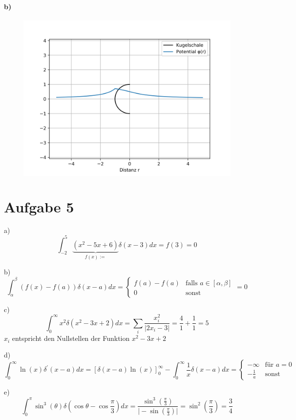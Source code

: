 \documentclass{article}
\begin{document}
\paragraph{b)}
\mbox{}
\begin{figure}[H]
	\centering
	\includegraphics[width=15cm]{aufgabe4plot.png}
\end{figure}

\newpage
\section*{Aufgabe 5}
\par{a)}
\[
	\int_{-2}^5 \underbrace{(x^2 - 5x + 6)}_{f(x) :=}
	\delta(x-3) dx
	= f(3) = 0
\]
\vspace{0.5cm}
\par{b)}
\[
	\int_\alpha^\beta
	(f(x) - f(a)) \delta(x - a) dx = 
	\begin{cases}
		f(a) - f(a)
		&\text{falls } a \in [\alpha, \beta] \\
		0
		&\text{sonst}
	\end{cases}
	= 0
	\]
\vspace{0.5cm}
\par{c)}
\[
	\int_0^\infty x^2 \delta(x^2 -3x + 2) dx
	=
	\sum_i \frac{x_i^2}{\vert 2x_i - 3 \vert} = \frac41 + \frac11 = 5
\]
$x_i$ entspricht den Nullstellen der Funktion $x^2 - 3x + 2$
\vspace{0.5cm}
\par{d)}
\[
	\int_0^\infty \ln(x) \delta^\prime(x-a) dx
	=
	\left[
		\delta(x-a) \ln(x)
	\right]_{0}^\infty
	-
	\int_0^\infty \frac1x \delta(x-a) dx
	=
	\begin{cases}
		-\infty &\text{für } a = 0\\
		-\frac1a &\text{sonst}
	\end{cases}
\]	
\vspace{0.5cm}
\par{e)}
\[
	\int_0^\pi \sin^3(\theta) \delta \left( \cos\theta - \cos\frac\pi3
	\right) dx
	=
	\frac{\sin^3 \left( \frac\pi3 \right)}
	{\vert -\sin\left( \frac\pi3 \right) \vert}
	= 
	\sin^2 \left( \frac\pi3 \right)
	= \frac34
\]
\end{document}
